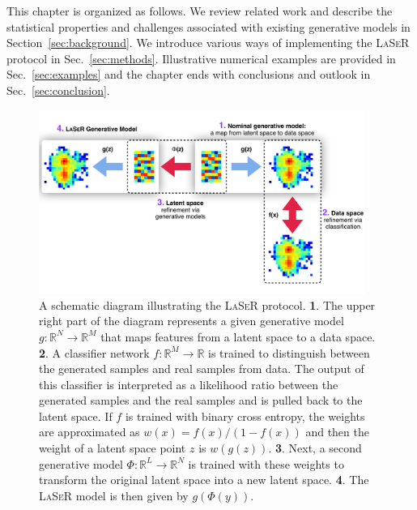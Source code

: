 This chapter is organized as follows. We review related work and describe the statistical properties and challenges associated with existing generative models in Section~\ref{sec:background}.  We introduce various ways of implementing the \textsc{LaSeR} protocol in Sec.~\ref{sec:methods}.  Illustrative numerical examples are provided in Sec.~\ref{sec:examples} and the chapter ends with conclusions and outlook in Sec.~\ref{sec:conclusion}.

\begin{figure}[h!]
    \centering
    \includegraphics[width=0.95\textwidth]{./figures/LSR/SchematicDiagram.pdf}
    \caption{A schematic diagram illustrating the \textsc{LaSeR} protocol.  {\large\textbf{\color{Fuchsia}1}}. The upper right part of the diagram represents a given generative model $g:\mathbb{R}^N\rightarrow \mathbb{R}^M$ that maps features from a latent space to a data space.  {\large\textbf{\color{Fuchsia}2}}. A classifier network $f:\mathbb{R}^M\rightarrow \mathbb{R}$ is trained to distinguish between the generated samples and real samples from data.  The output of this classifier is interpreted as a likelihood ratio between the generated samples and the real samples and is pulled back to the latent space.  If $f$ is trained with binary cross entropy, the weights are approximated as $w(x)=f(x)/(1-f(x))$ and then the weight of a latent space point $z$ is $w(g(z))$.  {\large\textbf{\color{Fuchsia}3}}. Next, a second generative model $\Phi:\mathbb{R}^L\rightarrow \mathbb{R}^N$ is trained with these weights to transform the original latent space into a new latent space.  {\large\textbf{\color{Fuchsia}4}}. The \textsc{LaSeR} model is then given by $g(\Phi(y))$.}
    \label{fig:schematic}
\end{figure}

